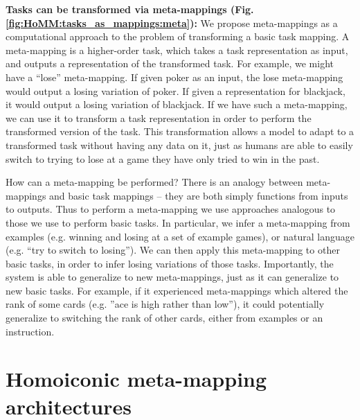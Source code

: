 \textbf{Tasks can be transformed via meta-mappings (Fig. \ref{fig:HoMM:tasks_as_mappings:meta}):} We propose meta-mappings as a computational approach to the problem of transforming a basic task mapping. A meta-mapping is a higher-order task, which takes a task representation as input, and outputs a representation of the transformed task. For example, we might have a ``lose'' meta-mapping. If given poker as an input, the lose meta-mapping would output a losing variation of poker. If given a representation for blackjack, it would output a losing variation of blackjack. If we have such a meta-mapping, we can use it to transform a task representation in order to perform the transformed version of the task. This transformation allows a model to adapt to a transformed task without having any data on it, just as humans are able to easily switch to trying to lose at a game they have only tried to win in the past. 

How can a meta-mapping be performed? There is an analogy between meta-mappings and basic task mappings -- they are both simply functions from inputs to outputs. Thus to perform a meta-mapping we use approaches analogous to those we use to perform basic tasks. In particular, we infer a meta-mapping from examples (e.g. winning and losing at a set of example games), or natural language (e.g. ``try to switch to losing''). We can then apply this meta-mapping to other basic tasks, in order to infer losing variations of those tasks. Importantly, the system is able to generalize to new meta-mappings, just as it can generalize to new basic tasks. For example, if it experienced meta-mappings which altered the rank of some cards (e.g. ''ace is high rather than low''), it could potentially generalize to switching the rank of other cards, either from examples or an instruction.



\section{Homoiconic meta-mapping architectures} \label{sec:HoMM:architecture}

